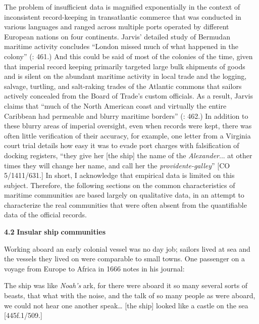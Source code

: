 The problem of insufficient data is magnified exponentially in the context of inconsistent record-keeping in transatlantic commerce that was conducted in various languages and ranged across multiple ports operated by different European nations on four continents. Jarvis’ detailed study of Bermudan maritime activity concludes “London missed much of what happened in the colony” (\citealt{Jarvis2010}: 461.) And this could be said of most of the colonies of the time, given that imperial record keeping primarily targeted large bulk shipments of goods and is silent on the abundant maritime activity in local trade and the logging, salvage, turtling, and salt-raking trades of the Atlantic commons that sailors actively concealed from the Board of Trade’s custom officials. As a result, Jarvis claims that “much of the North American coast and virtually the entire Caribbean had permeable and blurry maritime borders” (\citealt{Jarvis2010}: 462.) In addition to these blurry areas of imperial oversight, even when records were kept, there was often little verification of their accuracy, for example, one letter from a Virginia court trial details how easy it was to evade port charges with falsification of docking registers, “they give her [the ship] the name of the \textit{Alexander}... at other times they will change her name, and call her the \textit{providente-galley}” [CO 5/1411/631.] In short, I acknowledge that empirical data is limited on this subject.  Therefore, the following sections on the common characteristics of maritime communities are based largely on qualitative data, in an attempt to characterize the real communities that were often absent from the quantifiable data of the official records.

\textbf{4.2} \textbf{Insular} \textbf{ship} \textbf{communities}

Working aboard an early colonial vessel was no day job; sailors lived at sea and the vessels they lived on were comparable to small towns. One passenger on a voyage from Europe to Africa in 1666 notes in his journal: 

The ship was like \textit{Noah’s} ark, for there were aboard it so many several sorts of beasts, that what with the noise, and the talk of so many people as were aboard, we could not hear one another speak… [the ship] looked like a castle on the sea [445f.1/509.]

